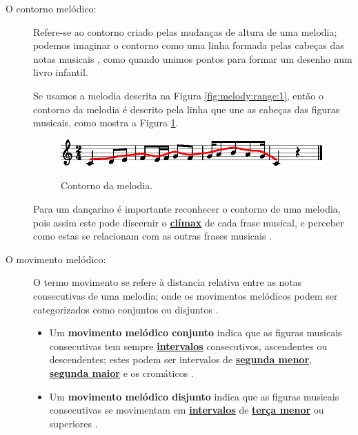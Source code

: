 \begin{description}
\item[O contorno melódico:] 
\label{ref:melodica:shape}
Refere-se ao contorno criado pelas mudanças de altura de uma melodia;
podemos imaginar o contorno como uma linha formada pelas cabeças das notas musicais 
\cite[pp. 44]{holland2013music} \cite[pp. 61]{chazin2016teaching} \cite[pp. 50]{langer2017theory},
como quando unimos pontos para formar um desenho num livro infantil.


\begin{example}
Se usamos a melodia descrita na Figura \ref{fig:melody:range:1}, então  
o contorno da melodia é descrito pela linha que une as cabeças das figuras musicais,
como mostra a Figura \ref{fig:melody:shape:1}.
\end{example}
\begin{figure}[!h]
\centering
\href{https://drive.google.com/file/d/1t-idPWPqz53dfPF7Fwtju9xmcIW7ucFw/view?usp=sharing}{\includegraphics[width=0.99\textwidth]{chapters/cap-musicalidade-percepcion/melodia-carateristicas-shape.eps}}
\caption{Contorno da melodia.}
\label{fig:melody:shape:1}
\end{figure}

Para um dançarino é importante reconhecer o contorno de uma melodia, 
pois assim este pode discernir o \hyperref[ref:climax]{\textbf{clímax}} de cada frase musical, 
e perceber como estas se relacionam com as outras frases musicais
\cite[pp. 45]{holland2013music}.

\item[O movimento melódico:]
\label{ref:melodica:movimento}
O termo movimento se refere à distancia relativa entre as notas consecutivas de uma melodia;
onde os movimentos melódicos podem ser categorizados como conjuntos ou disjuntos 
\cite[pp. 52]{langer2017theory} \cite[pp. 165]{reinato2010musicavol1} \cite[pp. 45]{holland2013music}. 
\begin{itemize}
\item Um \textbf{movimento melódico conjunto} indica 
\label{ref:melodica:movimento:conjunto}
que as figuras musicais consecutivas
tem sempre \hyperref[sec:intervalomelodico]{\textbf{intervalos}} consecutivos,
ascendentes ou descendentes; estes podem ser intervalos de 
\hyperref[tab:intervalomelodico2]{\textbf{segunda menor}},
\hyperref[tab:intervalomelodico2]{\textbf{segunda maior}} e
os cromáticos  \cite[pp. 165]{reinato2010musicavol1} \cite[pp. 52]{langer2017theory}.  
\item Um \textbf{movimento melódico disjunto} indica 
\label{ref:melodica:movimento:disjunto}
que as figuras musicais consecutivas
se movimentam em \hyperref[sec:intervalomelodico]{\textbf{intervalos}} 
de \hyperref[tab:intervalomelodico2]{\textbf{terça menor}} ou superiores 
\cite[pp. 166]{reinato2010musicavol1} \cite[pp. 53]{langer2017theory}.
\end{itemize}~


\end{description}
